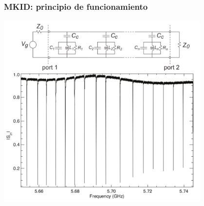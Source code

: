 \documentclass{beamer}
\begin{document}
\begin{frame}
				\frametitle{MKID: principio de funcionamiento}
								\begin{center}
												\includegraphics[height=0.68\textheight,width=0.8\textwidth]{circuito_equiv_y_transmision}
								\end{center}
\end{frame} 
\end{document}
